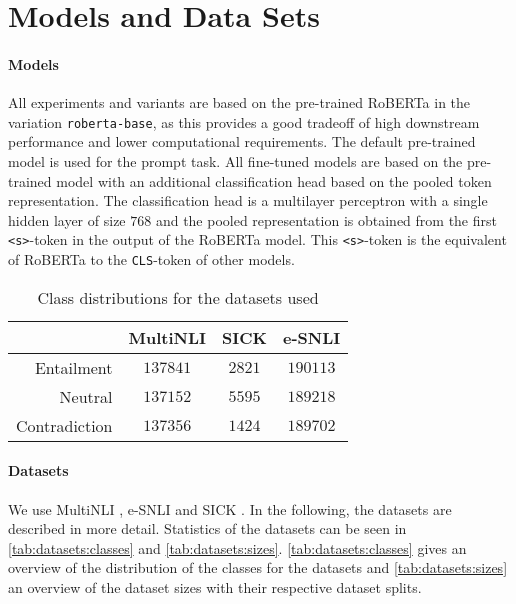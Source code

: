 \documentclass[12pt,a4paper]{article}
\begin{document}
\section{Models and Data Sets} \label{sec:models_datasets}
\paragraph{Models}
All experiments and variants are based on the pre-trained \acf{RoBERTa} \parencite{roberta} in the variation \texttt{roberta-base}, as this provides a good tradeoff of high downstream performance and lower computational requirements. The default pre-trained model is used for the prompt task. All fine-tuned models are based on the pre-trained model with an additional classification head based on the pooled token representation. The classification head is a multilayer perceptron with a single hidden layer of size $768$ and the pooled representation is obtained from the first \texttt{<s>}-token in the output of the \acs{RoBERTa} model. This \texttt{<s>}-token is the equivalent of \acs{RoBERTa} to the \texttt{CLS}-token of other models.

\begin{table}[h]
    \centering
    \caption{Class distributions for the datasets used}
    \begin{tabular}{r || c | c | c}
        & \acs{MultiNLI} & \acs{SICK} & \acs{e-SNLI} \\
        \hline
        Entailment & $137841$ & $2821$ & $190113$ \\
        Neutral & $137152$ & $5595$ & $189218$ \\
        Contradiction & $137356$ & $1424$ & $189702$
    \end{tabular}
    \label{tab:datasets:classes}
\end{table}

\paragraph{Datasets} We use \acs{MultiNLI} \parencite{multinli}, \acs{e-SNLI} \parencite{esnli} and \acs{SICK} \parencite{sick}. In the following, the datasets are described in more detail. Statistics of the datasets can be seen in \autoref{tab:datasets:classes} and \autoref{tab:datasets:sizes}. \autoref{tab:datasets:classes} gives an overview of the distribution of the classes for the datasets and \autoref{tab:datasets:sizes} an overview of the dataset sizes with their respective dataset splits.
\end{document}
